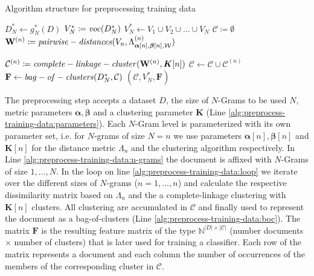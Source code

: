 \begin{algorithm}

\label{alg:preprocess-training-data}
\caption{Algorithm structure for preprocessing training data}
\begin{algorithmic}[1]
\label{alg:preprocess-training-data:parameters}
\State $D_N^* \gets g_N^*(D)$ 
\label{alg:preprocess-training-data:n-grams}
\State $V_N^* \coloneqq \mathit{voc}(D_N^*)$
\State $V_N^* \gets V_1 \cup V_2 \cup \ldots \cup V_N$
\State $\mathcal{C} \coloneqq \emptyset$
\label{alg:preprocess-training-data:loop}
\State $\mathbf{W}^{(n)} \coloneqq \mathit{pairwise-distances}(V_n,
\Lambda_{\boldsymbol \alpha[n], \boldsymbol \beta[n], \mathcal{W}}^{(n)})$

\State $\mathcal{C}^{(n)} \coloneqq
\mathit{complete-linkage-cluster}(\mathbf{W}^{(n)}, \boldsymbol K[n])$
\State $\mathcal{C} \gets \mathcal{C} \cup \mathcal{C}^{(n)}$
\EndFor
\State $\mathbf{F} \gets \mathit{bag-of-clusters}(D_N^*, \mathcal{C})$
\label{alg:preprocess-training-data:boc} 
\State \Return $(\mathcal{C}, V_N^*, \mathbf{F})$
\EndFunction
\end{algorithmic}
\end{algorithm}

The preprocessing step accepts a dataset $D$, the size of $N$-Grams to be used
$N$, metric parameters $\boldsymbol \alpha, \boldsymbol \beta$ and a clustering
parameter $\boldsymbol K$ (Line \ref{alg:preprocess-training-data:parameters}).
Each $N$-Gram level is parameterized with its own parameter set, i.e. for
$N$-grams of size $N=n$ we use parameters $\boldsymbol\alpha[n],
\boldsymbol\beta[n]$ and $\boldsymbol K[n]$ for the distance metric $\Lambda_n$
and the clustering algorithm respectively. In Line
\ref{alg:preprocess-training-data:n-grams} the document is affixed with
$N$-Grams of size $1,\ldots,N$. In the loop on line
\ref{alg:preprocess-training-data:loop} we iterate over the different
sizes of $N$-grams ($n=1,\ldots,n$) and calculate the respective dissimilarity
matrix based on $\Lambda_n$ and the a complete-linkage clustering with $\boldsymbol K[n]$ clusters. 
All clustering are accumulated in $\mathcal{C}$ and finally used to represent
the document as a bag-of-clusters (Line \ref{alg:preprocess-training-data:boc}). The matrix
$\mathbf{F}$ is the resulting feature matrix of the type
$\mathbb{N}^{|D|\times|\mathcal{C}|}$ (number documents $\times$ number of clusters) that is later used for training a
classifier. Each row of the matrix represents a document and each column the
number of occurrences of the members of the corresponding cluster in
$\mathcal{C}$.


